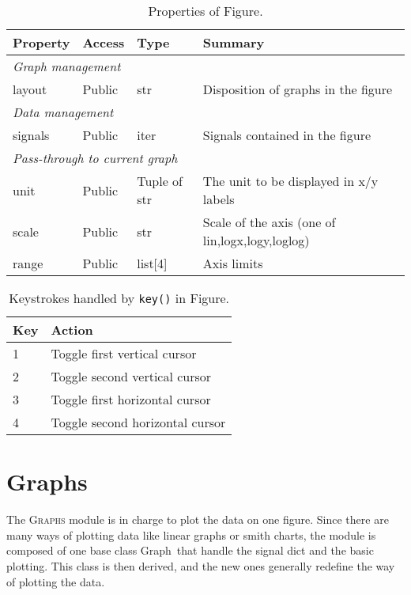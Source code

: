 \documentclass[a4paper,11pt]{article}
\newcommand{\meth}[1]{\texttt{#1()}}
\newcommand{\cls}[1]{\textsf{#1}}
\newcommand{\module}[1]{\textsc{#1}}
\newcommand{\graph}{\cls{Graph}}
\newcommand{\fig}{\cls{Figure}}
\begin{document}
\begin{table}[htbp]
  \centering\small\sf
  \begin{tabular}{llll}
    \hline
    Property & Access & Type & Summary \\
    \hline
    \multicolumn{4}{l}{\textit{Graph management}}\\
    layout & Public & str & Disposition of graphs in the figure\\
    \multicolumn{4}{l}{\textit{Data management}}\\
    signals & Public & iter & Signals contained in the figure \\
    \multicolumn{4}{l}{\textit{Pass-through to current graph}}\\
    unit & Public & Tuple of str & The unit to be displayed in x/y labels\\
    scale & Public & str & Scale of the axis (one of lin,logx,logy,loglog) \\
    range & Public & list[4] & Axis limits \\
    \hline
  \end{tabular}
  \caption{Properties of \fig.}
  \label{tab:figs:props}
\end{table}

\begin{table}[htbp]
  \centering\small\sf
  \begin{tabular}{ll}
    \hline
    Key & Action \\
    \hline
    1  & Toggle first vertical cursor \\
    2  & Toggle second vertical cursor \\
    3  & Toggle first horizontal cursor \\
    4  & Toggle second horizontal cursor \\
    \hline
  \end{tabular}
  \caption{Keystrokes handled by \meth{key} in \fig.}
  \label{tab:figs:key}
\end{table}

\section{Graphs}
\label{sec:graphs}
The \module{Graphs} module is in charge to plot the data on one figure.
Since there are many ways of plotting data like linear graphs or smith charts, the module is composed of one base class \graph\ that handle the signal dict and the basic plotting.
This class is then derived, and the new ones generally redefine the way of plotting the data.
\end{document}
